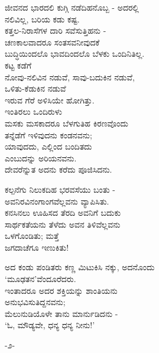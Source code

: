 \begin{myquote}
ಜೀವನದ ಭಾರದಲಿ ಕುಗ್ಗಿ ನಡೆದಿಹನೊಬ್ಬ - ಅದರಲ್ಲಿ\\ನಲಿವಿಲ್ಲ, ಬರಿಯ ಕಡು ಕಷ್ಟ.\\ಕತ್ತಲ-ನಿರಾಸೆಗಳ ದಾರಿ ಸವೆಸುತ್ತಿಹನು -\\ಚಣಕಾಲವಾದರೂ ಸಂತಸವನೀವುದಕೆ\\ಬುದ್ಧಿಯಿಂದಲೊ ಭಾವದಿಂದಲೊ ಬೆಳಕು ಒಂದಿನಿತಿಲ್ಲ.\\ಕಟ್ಟ ಕಡೆಗೆ\\ನೋವು-ನಲಿವಿನ ನಡುವೆ, ಸಾವು-ಬದುಕಿನ ನಡುವೆ,\\ಒಳಿತು-ಕೆಡುಕಿನ ನಡುವೆ\\ಇರುವ ಗೆರೆ ಅಳಿಸಿಯೇ ಹೋಗಿತ್ತು.\\ಇಂತಿರಲು ಒಂದಿರುಳು\\ಮಸಕು ಮಸಕಾದರೂ ಬೆಳಗುತಿಹ ಕಿರಣವೊಂದು\\ತನ್ನೆಡೆಗೆ ಇಳಿವುದನು ಕಂಡನವನು;\\ಯಾವುದದು, ಎಲ್ಲಿಂದ ಬಂದಿತದು\\ಎಂಬುದನ್ನು ಅರಿಯನವನು.\\ದೇವರೆನ್ನುತ ಅದನು ಕರೆದು ಪೂಜಿಸಿದನು.
\end{myquote}

\begin{myquote}
ಕಲ್ಪನೆಗು ನಿಲುಕದಿಹ ಭರವಸೆಯು ಬಂತು -\\ಅವನಿರವಿನಂಗಾಂಗವೆಲ್ಲವನು ವ್ಯಾಪಿಸಿತು.\\ಕನಸಿನಲು ಊಹಿಸದ ತೆರದಿ ಅವನಿಗೆ ಬದುಕು\\ಸಾರ್ಥಕತೆಯನು ತೆಳೆದು ಅವನ ತಿಳಿವೆಲ್ಲವನು\\ಒಳಗೊಂಡಿತು; ಮತ್ತೆ\\ಜಗದಾಚೆಗೂ ಇಣುಕಿತು!
\end{myquote}

\begin{myquote}
ಅದ ಕಂಡು ಪಂಡಿತರು ಕಣ್ಣ ಮಿಟುಕಿಸಿ ನಕ್ಕು, ಅದನೊಂದು\\‘ಮೂಢತನ’ವೆಂದೂರೆದರು.\\ಇಂತಾದರೂ ಅದರ ಶಕ್ತಿಯನ್ನು ಶಾಂತಿಯನು\\ಅನುಭವಿಸುತಿದ್ದನವನು;\\ಮೆಲುನುಡಿಯೊಳೇ ತಾನು ಮಾರ್ನುಡಿದನು -\\‘ಓ, ಮೌಡ್ಯವೇ, ಧನ್ಯ ಧನ್ಯ ನೀನು!’
\end{myquote}

\begin{center}
-೨-
\end{center}

